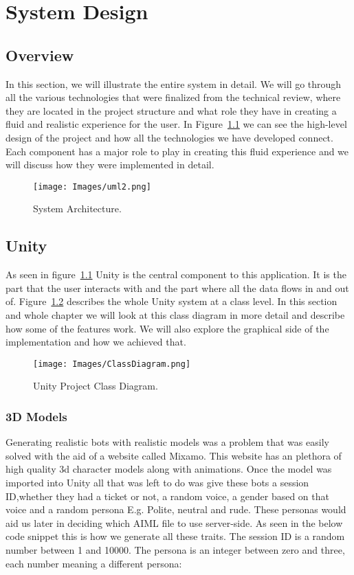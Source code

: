 \chapter{System Design}

\section{Overview}
In this section, we will illustrate the entire system in detail. We will go through all the various technologies that were finalized from the technical review, where they are located in the project structure and what role they have in creating a fluid and realistic experience for the user. In Figure~\ref{image:SystemArch} we can see the high-level design of the project and how all the technologies we have developed connect. Each component has a major role to play in creating this fluid experience and we will discuss how they were implemented in detail.

\begin{figure}[h!]
	\caption{System Architecture.}
	\label{image:SystemArch}
	\centering
	\texttt{[image: Images/uml2.png]}
\end{figure}

\section{Unity}
As seen in figure~\ref{image:SystemArch} Unity is the central component to this application. It is the part that the user interacts with and the part where all the data flows in and out of. Figure~\ref{image:ClassDiagram} describes the whole Unity system at a class level. In this section and whole chapter we will look at this class diagram in more detail and describe how some of the features work. We will also explore the graphical side of the implementation and how we achieved that.

\begin{figure}[h!]
	\caption{Unity Project Class Diagram.}
	\label{image:ClassDiagram}
	\centering
	\texttt{[image: Images/ClassDiagram.png]}
\end{figure}

\subsection{3D Models}
Generating realistic bots with realistic models was a problem that was easily solved with the aid of a website called Mixamo\cite{Mixamo31:online}. This website has an plethora of high quality 3d character models along with animations. Once the model was imported into Unity all that was left to do was give these bots a session ID,whether they had a ticket or not, a random voice, a gender based on that voice and a random persona E.g. Polite, neutral and rude. These personas would aid us later in deciding which AIML file to use server-side. As seen in the below code snippet this is how we generate all these traits. The session ID is a random number between 1 and 10000. The persona is an integer between zero and three, each number meaning a different persona: 

